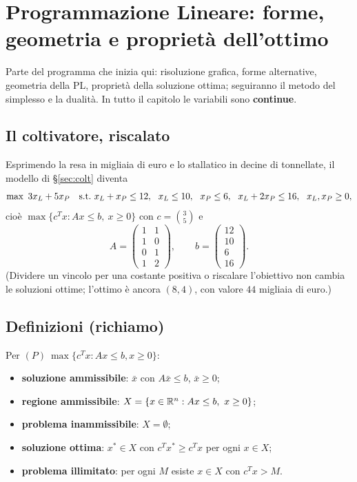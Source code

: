 \chapter[Programmazione Lineare: geometria e ottimo]{Programmazione Lineare: forme, geometria e proprietà dell'ottimo}\label{cap:pl}

Parte del programma che inizia qui: risoluzione grafica, forme alternative, geometria della PL, proprietà della soluzione ottima; seguiranno il metodo del simplesso e la dualità. In tutto il capitolo le variabili sono \textbf{continue}.

\section{Il coltivatore, riscalato}

Esprimendo la resa in migliaia di euro e lo stallatico in decine di tonnellate, il modello di \S\ref{sec:colt} diventa
\[
\max\ 3x_L+5x_P\quad \st\ x_L+x_P\le12,\ \ x_L\le10,\ \ x_P\le6,\ \ x_L+2x_P\le16,\ \ x_L,x_P\ge0,
\]
cioè $\max\{c^Tx: Ax\le b,\ x\ge0\}$ con
$c=\binom{3}{5}$ e
\[
A=\begin{pmatrix}1&1\\1&0\\0&1\\1&2\end{pmatrix},\qquad b=\begin{pmatrix}12\\10\\6\\16\end{pmatrix}.
\]
(Dividere un vincolo per una costante positiva o riscalare l'obiettivo non cambia le soluzioni ottime; l'ottimo è ancora $(8,4)$, con valore $44$ migliaia di euro.)

\section{Definizioni (richiamo)}
Per $(P)\ \max\{c^Tx: Ax\le b, x\ge0\}$:
\begin{itemize}[nosep]
\item \textbf{soluzione ammissibile}: $\bar x$ con $A\bar x\le b$, $\bar x\ge0$;
\item \textbf{regione ammissibile}: $X=\{x\in\mathbb{R}^n: Ax\le b,\ x\ge0\}$;
\item \textbf{problema inammissibile}: $X=\emptyset$;
\item \textbf{soluzione ottima}: $x^*\in X$ con $c^Tx^*\ge c^Tx$ per ogni $x\in X$;
\item \textbf{problema illimitato}: per ogni $M$ esiste $x\in X$ con $c^Tx>M$.
\end{itemize}

